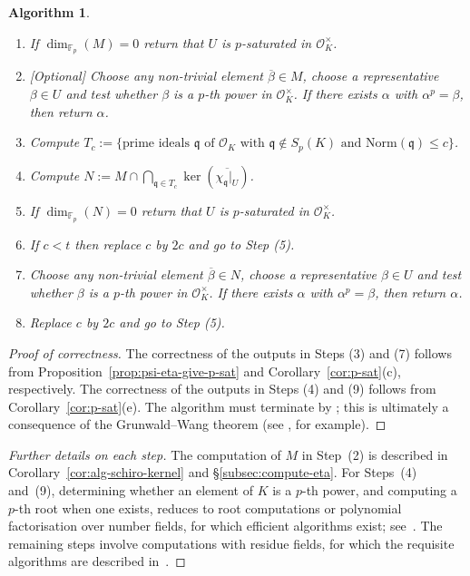 \documentclass[12pt, a4paper, usenames]{amsart}
\newcommand{\F}{\mathbb{F}}
\theoremstyle{plain}
\newtheorem{algorithm}[theorem]{Algorithm}
\theoremstyle{remark}
\theoremstyle{definition}
\newcommand{\Norm}{\mathrm{Norm}}
\begin{document}
\begin{algorithm}
\begin{enumerate}
    \item If $\dim_{\F_{p}}(M)=0$ return that $U$ is $p$-saturated in $\mathcal{O}_{K}^{\times}$.
    \item \textup{[Optional]} Choose any non-trivial element $\overline{\beta} \in M$,
    choose a representative $\beta \in U$ and test whether $\beta$ is a $p$-th power
    in $\mathcal{O}_{K}^{\times}$. If there exists $\alpha$ with $\alpha^{p} = \beta$, then return $\alpha$.
    \item Compute
    $T_{c} := \{ \text{prime ideals }\mathfrak{q} \text{ of }\mathcal{O}_{K} \text{ with }
    \mathfrak{q} \notin S_{p}(K) \text{ and }
    \Norm(\mathfrak{q}) \leq c\}$. 
    \item Compute $N := M \cap \bigcap_{\mathfrak{q} \in T_{c}} 
    \ker(\overline{\chi_{\mathfrak{q}}\vert_{U}})$.
    \item If $\dim_{\F_{p}}(N)=0$ return that $U$ is $p$-saturated in $\mathcal{O}_{K}^{\times}$.
    \item If $c < t$ then replace $c$ by $2c$ and go to Step \textup{(5)}.
    \item Choose any non-trivial element $\overline{\beta} \in N$,
    choose a representative $\beta \in U$ and test whether $\beta$ is a $p$-th power
    in $\mathcal{O}_{K}^{\times}$. If there exists $\alpha$ with $\alpha^{p} = \beta$, then return $\alpha$.
    \item Replace $c$ by $2c$ and go to Step \textup{(5)}.
\end{enumerate}
\end{algorithm}

\begin{proof}[Proof of correctness]
The correctness of the outputs in Steps (3) and (7) follows from Proposition~\ref{prop:psi-eta-give-p-sat} and Corollary~\ref{cor:p-sat}(c), respectively.
The correctness of the outputs in Steps (4) and (9) follows from Corollary~\ref{cor:p-sat}(e).
The algorithm must terminate by \cite[Proposition~4.8]{MR4440537}; 
this is ultimately a consequence of the Grunwald--Wang theorem (see \cite[Theorem~4.4]{MR4440537}, for example).
\end{proof}

\begin{proof}[Further details on each step]
The computation of $M$ in Step~(2) is described in Corollary~\ref{cor:alg-schiro-kernel} and \S\ref{subsec:compute-eta}.
For Steps~(4) and~(9), determining whether an element of $K$ is a $p$-th power, and computing a $p$-th root when one exists, reduces to root computations or polynomial factorisation over number fields, for which efficient algorithms exist; see~\cite{MR774816, MR2168610, MR2537701, zbMATH07854947}.
The remaining steps involve computations with residue fields, for which the requisite algorithms are described in~\cite{MR1228206}.
\end{proof}
\end{document}
